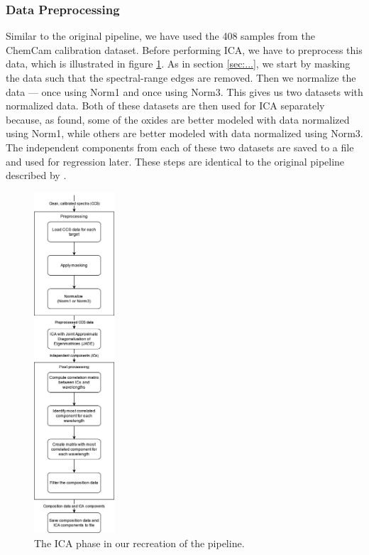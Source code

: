 \subsubsection{Data Preprocessing}
Similar to the original pipeline, we have used the 408 samples from the ChemCam calibration dataset.
Before performing ICA, we have to preprocess this data, which is illustrated in figure \ref{fig:ica_data}.
As in section \ref{sec:...}, we start by masking the data such that the spectral-range edges are removed. %
Then we normalize the data --- once using Norm1 and once using Norm3.
This gives us two datasets with normalized data.
Both of these datasets are then used for ICA separately because, as \citeauthor{cleggRecalibrationMarsScience2017} found, some of the oxides are better modeled with data normalized using Norm1, while others are better modeled with data normalized using Norm3.
The independent components from each of these two datasets are saved to a file and used for regression later.
These steps are identical to the original pipeline described by \citeauthor{cleggRecalibrationMarsScience2017}.

\begin{figure}
	\centering
	\includegraphics[width=0.2675\textwidth]{images/ica_data.png}
	\caption{The ICA phase in our recreation of the pipeline.}
	\label{fig:ica_data}
\end{figure}

